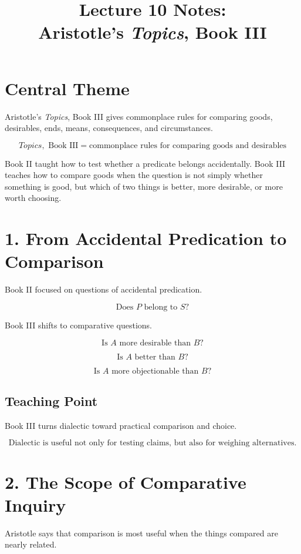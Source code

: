\documentclass[12pt]{article}
\title{Lecture 10 Notes:\\ Aristotle's \textit{Topics}, Book III}
\author{}
\date{}
\begin{document}
\maketitle

\section*{Central Theme}

Aristotle's \textit{Topics}, Book III gives commonplace rules for comparing
goods, desirables, ends, means, consequences, and circumstances.

\[
\boxed{
\textit{Topics}, \text{ Book III}
=
\text{commonplace rules for comparing goods and desirables}
}
\]

Book II taught how to test whether a predicate belongs accidentally. Book III
teaches how to compare goods when the question is not simply whether something
is good, but which of two things is better, more desirable, or more worth
choosing.

\section*{1. From Accidental Predication to Comparison}

Book II focused on questions of accidental predication.

\[
\text{Does } P \text{ belong to } S?
\]

Book III shifts to comparative questions.

\[
\text{Is } A \text{ more desirable than } B?
\]

\[
\text{Is } A \text{ better than } B?
\]

\[
\text{Is } A \text{ more objectionable than } B?
\]

\subsection*{Teaching Point}

Book III turns dialectic toward practical comparison and choice.

\[
\boxed{
\text{Dialectic is useful not only for testing claims, but also for weighing alternatives.}
}
\]

\section*{2. The Scope of Comparative Inquiry}

Aristotle says that comparison is most useful when the things compared are
nearly related.
\end{document}
